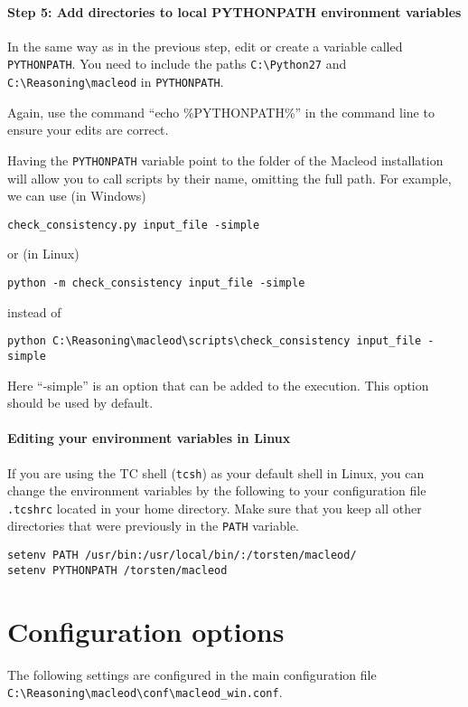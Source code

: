 \documentclass{article}
\begin{document}
\paragraph{Step 5: Add directories to local PYTHONPATH environment variables}

In the same way as in the previous step, edit or create a variable called \texttt{PYTHONPATH}. You need to include the paths \texttt{C:\textbackslash Python27} and \texttt{C:\textbackslash Reasoning\textbackslash macleod} in \texttt{PYTHONPATH}.

Again, use the command ``echo \%PYTHONPATH\%'' in the command line to ensure your edits are correct.

Having the \texttt{PYTHONPATH} variable point to the folder of the Macleod installation will allow you to call scripts by their name, omitting the full path. For example, we can use (in Windows)
\begin{verbatim}
check_consistency.py input_file -simple
\end{verbatim}
or (in Linux)
\begin{verbatim}
python -m check_consistency input_file -simple
\end{verbatim}
instead of
\begin{verbatim}
python C:\Reasoning\macleod\scripts\check_consistency input_file -simple
\end{verbatim}
Here ``-simple'' is an option that can be added to the execution. This option should be used by default.

\paragraph{Editing your environment variables in Linux}
If you are using the TC shell (\texttt{tcsh}) as your default shell in Linux, you can change the environment variables by the following to your configuration file \texttt{.tcshrc} located in your home directory.  Make sure that you keep all other directories that were previously in the \texttt{PATH} variable.
\begin{verbatim}
setenv PATH /usr/bin:/usr/local/bin/:/torsten/macleod/
setenv PYTHONPATH /torsten/macleod
\end{verbatim}


\section{Configuration options}

The following settings are configured in the main configuration file \texttt{C:\textbackslash Reasoning\textbackslash macleod\textbackslash conf\textbackslash macleod\_win.conf}.
\end{document}
